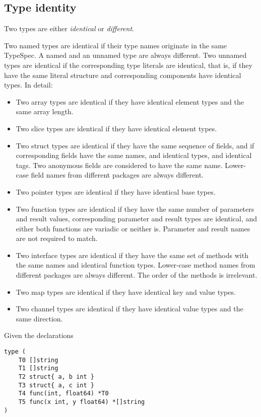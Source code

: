 {\subsection*{Type identity}

Two types are either \emph{identical} or \emph{different}.

Two named types are identical if their type names originate in the same
TypeSpec. A named and an unnamed type are
always different. Two unnamed types are identical if the corresponding
type literals are identical, that is, if they have the same literal
structure and corresponding components have identical types. In detail:

\begin{itemize}
\item
  Two array types are identical if they have identical element types and
  the same array length.
\item
  Two slice types are identical if they have identical element types.
\item
  Two struct types are identical if they have the same sequence of
  fields, and if corresponding fields have the same names, and identical
  types, and identical tags. Two anonymous fields are considered to have
  the same name. Lower-case field names from different packages are
  always different.
\item
  Two pointer types are identical if they have identical base types.
\item
  Two function types are identical if they have the same number of
  parameters and result values, corresponding parameter and result types
  are identical, and either both functions are variadic or neither is.
  Parameter and result names are not required to match.
\item
  Two interface types are identical if they have the same set of methods
  with the same names and identical function types. Lower-case method
  names from different packages are always different. The order of the
  methods is irrelevant.
\item
  Two map types are identical if they have identical key and value
  types.
\item
  Two channel types are identical if they have identical value types and
  the same direction.
\end{itemize}

Given the declarations

\begin{Verbatim}[frame=single]
type (
    T0 []string
    T1 []string
    T2 struct{ a, b int }
    T3 struct{ a, c int }
    T4 func(int, float64) *T0
    T5 func(x int, y float64) *[]string
)
\end{Verbatim}

}
